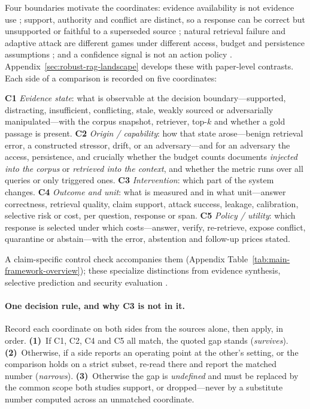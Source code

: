 \documentclass[11pt]{article}
\begin{document}
Four boundaries motivate the coordinates: evidence availability is not evidence
use \citep{irrelevantContext2023,raat2024,rgb2023,chainOfNote2023}; support,
authority and conflict are distinct, so a response can be correct but
unsupported or faithful to a superseded source
\citep{ragTruth2024,astuteRAG2025,freshllms2024}; natural retrieval failure and
adaptive attack are different games under different access, budget and
persistence assumptions \citep{poisonedRAG2024,phantom2024,certifiedRAG2024};
and a confidence signal is not an action policy
\citep{guo2017calibration,geifman2017selective,selfRAG2023,crag2024,
sufficientContext2024}. Appendix~\ref{sec:robust-rag-landscape} develops these
with paper-level contrasts. Each side of a comparison is recorded on five
coordinates:

\noindent\textbf{C1} \emph{Evidence state}: what is observable at the decision
boundary---supported, distracting, insufficient, conflicting, stale, weakly
sourced or adversarially manipulated---with the corpus snapshot, retriever,
top-$k$ and whether a gold passage is present. \textbf{C2} \emph{Origin /
capability}: how that state arose---benign retrieval error, a constructed
stressor, drift, or an adversary---and for an adversary the access, persistence,
and crucially whether the budget counts documents \emph{injected into the
corpus} or \emph{retrieved into the context}, and whether the metric runs over
all queries or only triggered ones. \textbf{C3} \emph{Intervention}: which part
of the system changes. \textbf{C4} \emph{Outcome and unit}: what is measured and
in what unit---answer correctness, retrieval quality, claim support, attack
success, leakage, calibration, selective risk or cost, per question, response or
span. \textbf{C5} \emph{Policy / utility}: which response is selected under
which costs---answer, verify, re-retrieve, expose conflict, quarantine or
abstain---with the error, abstention and follow-up prices stated.

\noindent A claim-specific control check accompanies them (Appendix
Table~\ref{tab:main-framework-overview}); these specialize distinctions from
evidence synthesis, selective prediction and security evaluation
\citep{richardson1995pico,chow1970reject,papernot2018sok}.

\paragraph{One decision rule, and why C3 is not in it.}
Record each coordinate on both sides from the sources alone, then apply, in
order. \textbf{(1)}~If C1, C2, C4 and C5 all match, the quoted gap stands
(\emph{survives}). \textbf{(2)}~Otherwise, if a side reports an operating point
at the other's setting, or the comparison holds on a strict subset, re-read
there and report the matched number (\emph{narrows}). \textbf{(3)}~Otherwise the
gap is \emph{undefined} and must be replaced by the common scope both studies
support, or dropped---never by a substitute number computed across an unmatched
coordinate.
\end{document}
